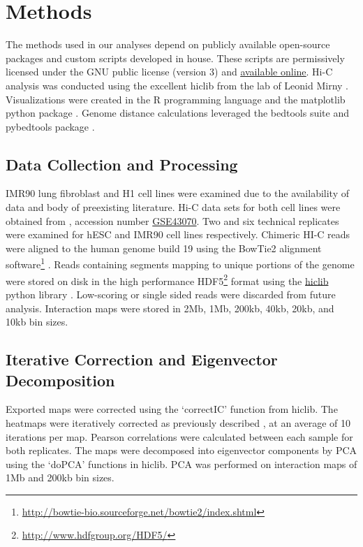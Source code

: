 \chapter{Methods}

The methods used in our analyses depend on publicly available open-source packages and custom scripts developed in house.
These scripts are permissively licensed under the GNU public license (version 3) and
\href{https://github.com/New-College-of-Florida/Jonathan-Niles-Thesis}{\underline{available online}}.  Hi-C analysis was conducted using
the excellent hiclib from the lab of Leonid Mirny \citep{imakaev2012}.  Visualizations were created in the R programming
language \citep{r2009} and the matplotlib python package \citep{hunter2007}.  Genome distance calculations leveraged the
bedtools suite \citep{quinlan2010} and pybedtools package \citep{dale2011}.

\section*{Data Collection and Processing}

IMR90 lung fibroblast and H1  cell lines were examined due to the availability of data and body of preexisting
literature.  Hi-C data sets for both cell lines were obtained from  \citep{edgar2002}, accession number
\href{http://www.ncbi.nlm.nih.gov/geo/query/acc.cgi?acc=GSE43070}{GSE43070}.  Two and six technical replicates were examined for
\gls{hESC} and IMR90 cell lines respectively.  Chimeric HI-C reads were aligned to the human genome build 19 using the BowTie2
alignment software\footnote{\url{http://bowtie-bio.sourceforge.net/bowtie2/index.shtml}} \citep{langmead2012}. Reads containing
segments mapping to unique portions of the genome were stored on disk in the high performance
HDF5\footnote{\url{http://www.hdfgroup.org/HDF5/}} format using the \href{https://bitbucket.org/mirnylab/hiclib}{hiclib} python
library \citep{imakaev2012}.  Low-scoring or single sided reads were discarded from future analysis.  Interaction maps were
stored in 2Mb, 1Mb, 200kb, 40kb, 20kb, and 10kb bin sizes.

\section*{Iterative Correction and Eigenvector Decomposition}

Exported maps were corrected using the `correctIC' function from hiclib.  The heatmaps were iteratively corrected as previously
described \citep{imakaev2012}, at an average of 10 iterations per map.  Pearson correlations were calculated between each sample
for both replicates.  The maps were decomposed into eigenvector components by \gls{PCA} using the `doPCA' functions in hiclib.
\gls{PCA} was performed on interaction maps of 1Mb and 200kb bin sizes.

